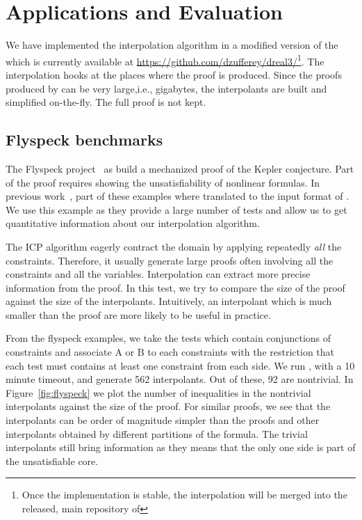 \section{Applications and Evaluation}
\label{sec:eval}

We have implemented the interpolation algorithm in a modified version of the \dReal which is currently available at \url{https://github.com/dzufferey/dreal3/}\footnote{Once the implementation is stable, the interpolation will be merged into the released, main repository of \dReal}.
The interpolation hooks at the places where the proof is produced.
Since the proofs produced by \dReal can be very large,i.e., gigabytes, the interpolants are built and simplified on-the-fly.
The full proof is not kept.

\subsection{Flyspeck benchmarks}

The Flyspeck project~\cite{???} as build a mechanized proof of the Kepler conjecture.
Part of the proof requires showing the unsatisfiability of nonlinear formulas.
In previous work~\cite{???}, part of these examples where translated to the input format of \dReal.
We use this example as they provide a large number of tests and allow us to get quantitative information about our interpolation algorithm.

The ICP algorithm eagerly contract the domain by applying repeatedly \emph{all} the constraints. Therefore, it usually generate large proofs often involving all the constraints and all the variables.
Interpolation can extract more precise information from the proof.
In this test, we try to compare the size of the proof against the size of the interpolants.
Intuitively, an interpolant which is much smaller than the proof are more likely to be useful in practice.

From the flyspeck examples, we take the tests which contain conjunctions of constraints and associate A or B to each constraints with the restriction that each test must contains at least one constraint from each side.
We run \dReal, with a 10 minute timeout, and generate 562 interpolants.
Out of these, 92 are nontrivial.
In Figure~\ref{fig:flyspeck} we plot the number of inequalities in the nontrivial interpolants against the size of the proof.
For similar proofs, we see that the interpolants can be order of magnitude simpler than the proofs and other interpolants obtained by different partitions of the formula.
The trivial interpolants still bring information as they means that the only one side is part of the unsatisfiable core.



